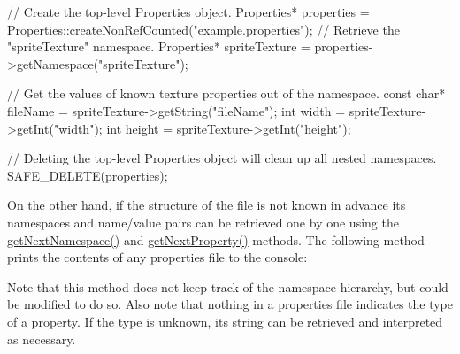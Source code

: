 \begin{DoxyVerb}   // Create the top-level Properties object.
   Properties* properties = Properties::createNonRefCounted("example.properties");
   // Retrieve the "spriteTexture" namespace.
   Properties* spriteTexture = properties->getNamespace("spriteTexture");

   // Get the values of known texture properties out of the namespace.
   const char* fileName = spriteTexture->getString("fileName");
   int width = spriteTexture->getInt("width");
   int height = spriteTexture->getInt("height");

   // Deleting the top-level Properties object will clean up all nested namespaces.
   SAFE_DELETE(properties);
\end{DoxyVerb}


On the other hand, if the structure of the file is not known in advance its namespaces and name/value pairs can be retrieved one by one using the \hyperlink{classProperties_af3933a1797582540f81ef13a981801d3}{get\+Next\+Namespace()} and \hyperlink{classProperties_a396aad2d114059ca157db26c511da196}{get\+Next\+Property()} methods. The following method prints the contents of any properties file to the console\+:



Note that this method does not keep track of the namespace hierarchy, but could be modified to do so. Also note that nothing in a properties file indicates the type of a property. If the type is unknown, its string can be retrieved and interpreted as necessary. 

